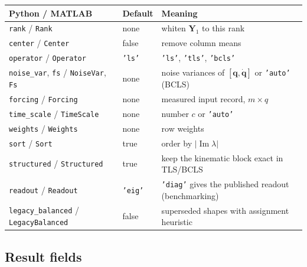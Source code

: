\documentclass[report]{nld}
\theoremstyle{remark}\newtheorem*{remark}{Remark}
\newcommand{\Y}{\mathbf{Y}}
\newcommand{\code}[1]{\texttt{#1}}
\begin{document}
\begin{center}\small
\begin{tabularx}{\linewidth}{@{}>{\raggedright}p{3.4cm}>{\raggedright}p{2.4cm}X@{}}
\toprule
Python / MATLAB & Default & Meaning\\
\midrule
\code{rank} / \code{Rank} & none & whiten $\Y_1$ to this rank\\
\code{center} / \code{Center} & false & remove column means\\
\code{operator} / \code{Operator} & \code{'ls'} & \code{'ls'}, \code{'tls'}, \code{'bcls'}\\
\code{noise\_var}, \code{fs} / \code{NoiseVar}, \code{Fs} & none & noise variances of $[\mathbf{q},\dot{\mathbf{q}}]$ or \code{'auto'} (BCLS)\\
\code{forcing} / \code{Forcing} & none & measured input record, $m\times q$\\
\code{time\_scale} / \code{TimeScale} & none & number $c$ or \code{'auto'}\\
\code{weights} / \code{Weights} & none & row weights\\
\code{sort} / \code{Sort} & true & order by $|\operatorname{Im}\lambda|$\\
\code{structured} / \code{Structured} & true & keep the kinematic block exact in TLS/BCLS\\
\code{readout} / \code{Readout} & \code{'eig'} & \code{'diag'} gives the published readout (benchmarking)\\
\code{legacy\_balanced} / \code{LegacyBalanced} & false & superseded shapes with assignment heuristic\\
\bottomrule
\end{tabularx}
\end{center}

\subsection{Result fields}
\end{document}
